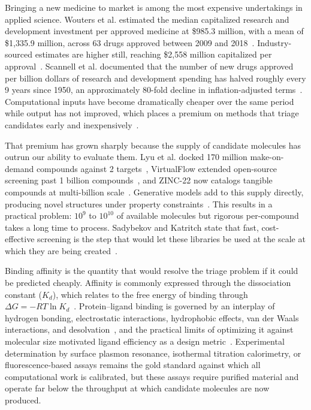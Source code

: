 \documentclass[times, twoside]{zHenriquesLab-StyleBioRxiv}
\newcommand{\Pl}{Protein--ligand\xspace}
\begin{document}
Bringing a new medicine to market is among the most expensive undertakings in applied science. Wouters et al. estimated the median capitalized research and development investment per approved medicine at \$985.3 million, with a mean of \$1,335.9 million, across 63 drugs approved between 2009 and 2018~\cite{wouters2020cost}. Industry-sourced estimates are higher still, reaching \$2,558 million capitalized per approval~\cite{dimasi2016innovation}. Scannell et al. documented that the number of new drugs approved per billion dollars of research and development spending has halved roughly every 9 years since 1950, an approximately 80-fold decline in inflation-adjusted terms~\cite{scannell2012eroom}. Computational inputs have become dramatically cheaper over the same period while output has not improved, which places a premium on methods that triage candidates early and inexpensively~\cite{paul2010improve}.

That premium has grown sharply because the supply of candidate molecules has outrun our ability to evaluate them. Lyu et al. docked 170 million make-on-demand compounds against 2 targets~\cite{lyu2019ultralarge}, VirtualFlow extended open-source screening past 1 billion compounds~\cite{gorgulla2020virtualflow}, and ZINC-22 now catalogs tangible compounds at multi-billion scale~\cite{tingle2023zinc22}. Generative models add to this supply directly, producing novel structures under property constraints~\cite{olivecrona2017reinvent,blaschke2020reinvent2}. This results in a practical problem: $10^9$ to $10^{10}$ of available molecules but rigorous per-compound takes a long time to process. Sadybekov and Katritch state that fast, cost-effective screening is the step that would let these libraries be used at the scale at which they are being created~\cite{sadybekov2023computational}.

Binding affinity is the quantity that would resolve the triage problem if it could be predicted cheaply. Affinity is commonly expressed through the dissociation constant ($K_d$), which relates to the free energy of binding through $\Delta G = -RT \ln K_d$~\cite{gilson2007calculation}. \Pl binding is governed by an interplay of hydrogen bonding, electrostatic interactions, hydrophobic effects, van der Waals interactions, and desolvation~\cite{gilson2007calculation}, and the practical limits of optimizing it against molecular size motivated ligand efficiency as a design metric~\cite{hopkins2004ligand}. Experimental determination by surface plasmon resonance, isothermal titration calorimetry, or fluorescence-based assays remains the gold standard against which all computational work is calibrated, but these assays require purified material and operate far below the throughput at which candidate molecules are now produced.
\end{document}
